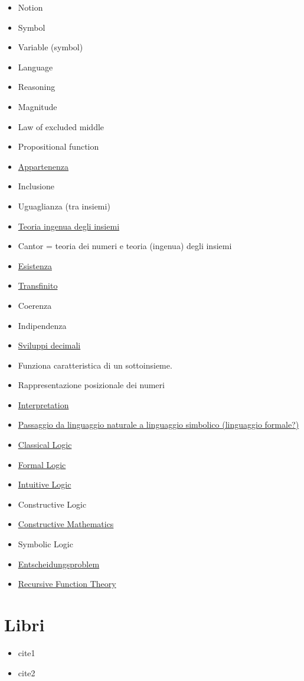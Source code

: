 \documentclass[a4paper,10pt]{article}
\begin{document}
\begin{itemize}
 \item Notion
 \item Symbol
 \item Variable (symbol)
 \item Language
 \item Reasoning
 \item Magnitude
 \item Law of excluded middle
 \item Propositional function
 \item \href{Appartenenza.html}{Appartenenza}
 \item Inclusione
 \item Uguaglianza (tra insiemi)
 \item \href{TeoriaIngenuaInsiemi.html}{Teoria ingenua degli insiemi}
 \item Cantor = teoria dei numeri e teoria (ingenua) degli insiemi
 \item \href{./Esistenza.html}{Esistenza}
 \item \href{./Transfinito.html}{Transfinito}
 \item Coerenza
 \item Indipendenza
 \item \href{./SviluppiDecimali.html}{Sviluppi decimali}
 \item Funziona caratteristica di un sottoinsieme.
 \item Rappresentazione posizionale dei numeri
 \item \href{./Interpretation.html}{Interpretation}
 \item \href{./Passaggio.html}{Passaggio da linguaggio naturale a linguaggio simbolico (linguaggio formale?)}
 \item \href{ClassicalLogic.html}{Classical Logic}
 \item \href{FormalLogic.html}{Formal Logic}
 \item \href{./IntuitiveLogic.html}{Intuitive Logic}
 \item Constructive Logic
 \item \href{ConstructiveMathematics.html}{Constructive Mathematics}
 \item Symbolic Logic
 \item \href{Entscheidungsproblem.html}{Entscheidungsproblem}
 \item \href{./RecursiveFunctionTheory.html}{Recursive Function Theory}
\end{itemize}

\section{Libri}
  \begin{itemize}
   \item cite{1}
   \item cite{2}
  \end{itemize}
\end{document}
